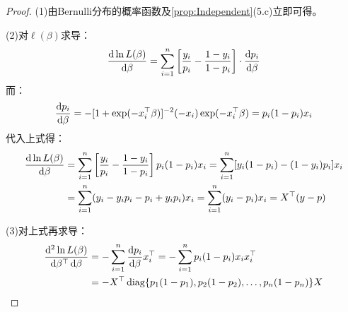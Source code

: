 \begin{proof}
	(1)由Bernulli分布的概率函数及\cref{prop:Independent}(5.c)立即可得。\par
	(2)对$\ell(\beta)$求导：
	\begin{equation*}
		\frac{\mathop{}\!\mathrm{d}\ln L(\beta)}{\mathop{}\!\mathrm{d}\beta}=\sum_{i=1}^n\left[\frac{y_i}{p_i}-\frac{1-y_i}{1-p_i}\right]\cdot\frac{\mathop{}\!\mathrm{d} p_i}{\mathop{}\!\mathrm{d}\beta}
	\end{equation*}
	而：
	\begin{equation*}
		\frac{\mathop{}\!\mathrm{d} p_i}{\mathop{}\!\mathrm{d}\beta}=-[1+\exp(-x_i^{\top}\beta)]^{-2}(-x_i)\exp(-x_i^{\top}\beta)=p_i(1-p_i)x_i
	\end{equation*}
	代入上式得：
	\begin{align*}
		\frac{\mathop{}\!\mathrm{d}\ln L(\beta)}{\mathop{}\!\mathrm{d} \beta}&=\sum_{i=1}^{n}\left[\frac{y_i}{p_i}-\frac{1-y_i}{1-p_i}\right]p_i(1-p_i)x_i=\sum_{i=1}^{n}[y_i(1-p_i)-(1-y_i)p_i]x_i \\
		&=\sum_{i=1}^{n}(y_i-y_ip_i-p_i+y_ip_i)x_i=\sum_{i=1}^n(y_i-p_i)x_i=X^{\top}(y-p)
	\end{align*}\par
	(3)对上式再求导：
	\begin{align*}
		\frac{\mathop{}\!\mathrm{d}^2\ln L(\beta)}{\mathop{}\!\mathrm{d}\beta^{\top}\mathop{}\!\mathrm{d}\beta}
		&=-\sum_{i=1}^{n}\frac{\mathop{}\!\mathrm{d} p_i}{\mathop{}\!\mathrm{d}\beta}x_i^{\top}=-\sum_{i=1}^{n}p_i(1-p_i)x_ix_i^{\top} \\
		&=-X^{\top}\operatorname{diag}\{p_1(1-p_1),p_2(1-p_2),\dots,p_n(1-p_n)\}X\qedhere
	\end{align*}
\end{proof}

